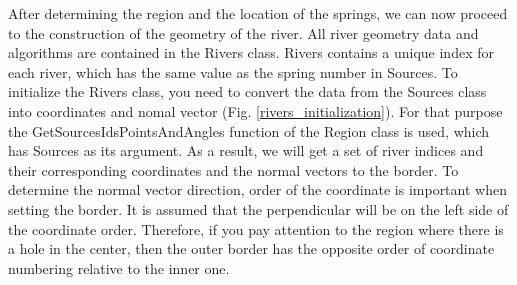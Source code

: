 \documentclass[]{pracamgr}
\begin{document}
      After determining the region and the location of the springs, we can now proceed to the construction of the geometry of the river. All river geometry data and algorithms are contained in the Rivers class. Rivers contains a unique index for each river, which has the same value as the spring number in Sources. To initialize the Rivers class, you need to convert the data from the Sources class into coordinates and nomal vector (Fig. \ref{rivers_initialization}). For that purpose the GetSourcesIdsPointsAndAngles function of the Region class is used, which has Sources as its argument. As a result, we will get a set of river indices and their corresponding coordinates and the normal vectors to the border. To determine the normal vector direction, order of the coordinate is important when setting the border. It is assumed that the perpendicular will be on the left side of the coordinate order. Therefore, if you pay attention to the region where there is a hole in the center, then the outer border has the opposite order of coordinate numbering relative to the inner one.
      
\end{document}
